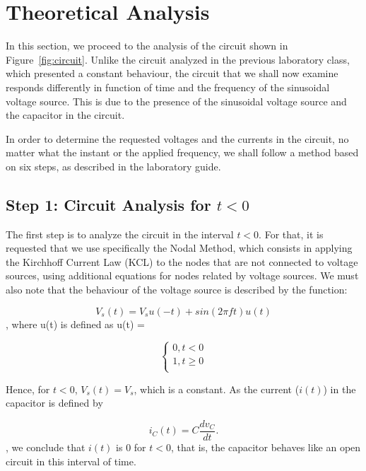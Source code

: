 \section{Theoretical Analysis}
\label{sec:analysis}

In this section, we proceed to the analysis of the circuit shown in Figure~\ref{fig:circuit}. Unlike the circuit analyzed in the previous laboratory class, which presented a constant behaviour, the circuit that we shall now examine responds differently in function of time and the frequency of the sinusoidal voltage source. This is due to the presence of the sinusoidal voltage source and the capacitor in the circuit.

In order to determine the requested voltages and the currents in the circuit, no matter what the instant or the applied frequency, we shall follow a method based on six steps, as described in the laboratory guide.

\subsection{Step 1: Circuit Analysis for $t < 0$}

The first step is to analyze the circuit in the interval $t < 0$. For that, it is requested that we use specifically the Nodal Method, which consists in applying the Kirchhoff Current Law (KCL) to the nodes that are not connected to voltage sources, using additional equations for nodes related by voltage sources. 
We must also note that the behaviour of the voltage source is described by the function:

\begin{equation}
	V_s(t) = V_s u(-t) + sin(2\pi f t)u(t)
	\label{eq:voltage_source}
\end{equation}
, where u(t) is defined as u(t) = 

\begin{equation}
\begin{cases}
	0, t < 0 \\
	1, t \geq 0 \\
\end{cases}
\end{equation}

Hence, for $t < 0$, $V_s(t) = V_s$, which is a constant. As the current ($i(t)$) in the capacitor is defined by 

\begin{equation}
	i_C(t) = C\frac{dv_C}{dt}.
	\label{eq:voltage_source}
\end{equation}
, we conclude that $i(t)$ is 0 for $t < 0$, that is, the capacitor behaves like an open circuit in this interval of time.

